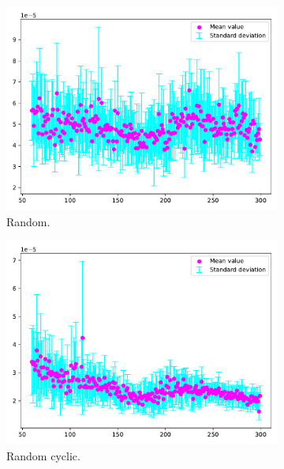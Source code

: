 \begin{figure}[H]
    \centering
    \begin{subfigure}[b]{.24\textwidth}
        \centering
        \includegraphics[width=\textwidth]{figures/m/random_function_of_m_n_10_m_20_90_kappa_524564.1271422369}
        \caption{Random.}\label{fig:ma}
    \end{subfigure}
    \hfill
    \begin{subfigure}[b]{.24\textwidth}
        \centering
        \includegraphics[width=\textwidth]{figures/m/random_cyclic_function_of_m_n_10_m_20_90_kappa_60194.24212737572}
        \caption{Random cyclic.}\label{fig:mb}
    \end{subfigure}
    \hfill
    \begin{subfigure}[b]{.24\textwidth}

\end{subfigure}
\end{figure}
